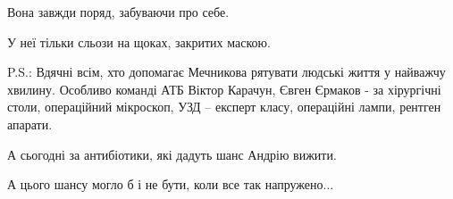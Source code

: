 Вона завжди поряд, забуваючи про себе.  

У неї тільки сльози на щоках, закритих маскою.

P.S.: Вдячні всім, хто допомагає Мечникова рятувати людські життя у найважчу
хвилину.  Особливо команді АТБ Віктор Карачун, Євген Єрмаков - за хірургічні
столи, операційний мікроскоп, УЗД – експерт класу, операційні лампи, рентген
апарати.

А сьогодні за антибіотики, які дадуть шанс Андрію вижити. 

А цього шансу могло б і не бути, коли все так напружено...

